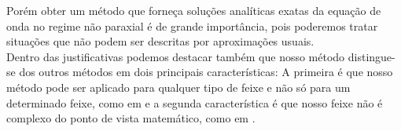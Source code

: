 Porém obter um método que forneça soluções analíticas exatas da equação de onda no regime não paraxial é de grande importância, pois poderemos tratar situações que não podem ser descritas por aproximações usuais.\\
Dentro das justificativas podemos destacar também que nosso método distingue-se dos outros métodos em dois principais características: A primeira é que nosso método pode ser aplicado para qualquer tipo de feixe e não s\'o para um determinado feixe, como em \cite{Lya:13}\cite{Lya:22}\cite{Lya:9}\cite{Lya:4}\cite{Lya:11} e a segunda característica é que nosso feixe não é complexo do ponto de vista matemático, como em \cite{Lya:4}\cite{Lya:19}\cite{Lya:23}\cite{Lya:14}\cite{Lya:7}\cite{Lya:15}.
  

